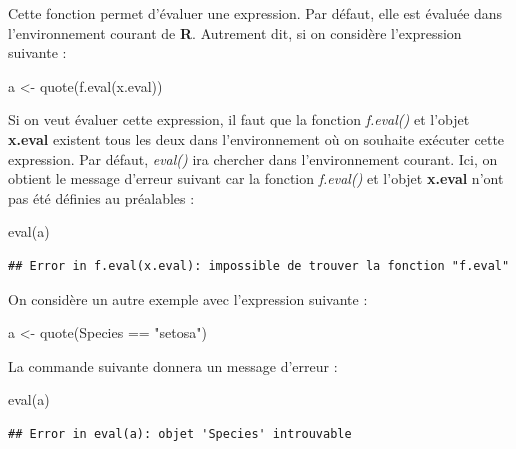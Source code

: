 \documentclass[
]{book}
\newenvironment{Shaded}{\begin{snugshade}}{\end{snugshade}}
\newcommand{\FunctionTok}[1]{\textcolor[rgb]{0.00,0.00,0.00}{#1}}
\newcommand{\NormalTok}[1]{#1}
\newcommand{\OtherTok}[1]{\textcolor[rgb]{0.56,0.35,0.01}{#1}}
\newcommand{\SpecialCharTok}[1]{\textcolor[rgb]{0.00,0.00,0.00}{#1}}
\newcommand{\StringTok}[1]{\textcolor[rgb]{0.31,0.60,0.02}{#1}}
\theoremstyle{definition}
\theoremstyle{definition}
\theoremstyle{definition}
\theoremstyle{definition}
\theoremstyle{remark}
\begin{document}
Cette fonction permet d'évaluer une expression. Par défaut, elle est évaluée dans l'environnement courant de \textbf{R}. Autrement dit, si on considère l'expression suivante :

\begin{Shaded}
\begin{Highlighting}[]
\NormalTok{a }\OtherTok{\textless{}{-}} \FunctionTok{quote}\NormalTok{(}\FunctionTok{f.eval}\NormalTok{(x.eval))}
\end{Highlighting}
\end{Shaded}

Si on veut évaluer cette expression, il faut que la fonction \emph{f.eval()} et l'objet \textbf{x.eval} existent tous les deux dans l'environnement où on souhaite exécuter cette expression. Par défaut, \emph{eval()} ira chercher dans l'environnement courant. Ici, on obtient le message d'erreur suivant car la fonction \emph{f.eval()} et l'objet \textbf{x.eval} n'ont pas été définies au préalables :

\begin{Shaded}
\begin{Highlighting}[]
\FunctionTok{eval}\NormalTok{(a)}
\end{Highlighting}
\end{Shaded}

\begin{verbatim}
## Error in f.eval(x.eval): impossible de trouver la fonction "f.eval"
\end{verbatim}

On considère un autre exemple avec l'expression suivante :

\begin{Shaded}
\begin{Highlighting}[]
\NormalTok{a }\OtherTok{\textless{}{-}} \FunctionTok{quote}\NormalTok{(Species }\SpecialCharTok{==} \StringTok{"setosa"}\NormalTok{)}
\end{Highlighting}
\end{Shaded}

La commande suivante donnera un message d'erreur :

\begin{Shaded}
\begin{Highlighting}[]
\FunctionTok{eval}\NormalTok{(a)}
\end{Highlighting}
\end{Shaded}

\begin{verbatim}
## Error in eval(a): objet 'Species' introuvable
\end{verbatim}
\end{document}
